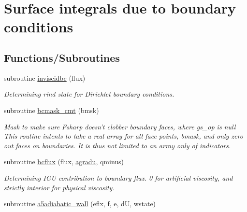 \hypertarget{group__bcond}{\section{Surface integrals due to boundary conditions}
\label{group__bcond}
}
\subsection*{Functions/\-Subroutines}
\begin{DoxyCompactItemize}
\item 
\hypertarget{group__bcond_ga45475eec850fc7ef33c51a25b4f86602}{subroutine \hyperlink{group__bcond_ga45475eec850fc7ef33c51a25b4f86602}{inviscidbc} (flux)}\label{group__bcond_ga45475eec850fc7ef33c51a25b4f86602}

\begin{DoxyCompactList}\small\item\em Determining rind state for Dirichlet boundary conditions. \end{DoxyCompactList}\item 
\hypertarget{group__bcond_ga917af547cc29afcf40e2b54c6a97c90d}{subroutine \hyperlink{group__bcond_ga917af547cc29afcf40e2b54c6a97c90d}{bcmask\-\_\-cmt} (bmsk)}\label{group__bcond_ga917af547cc29afcf40e2b54c6a97c90d}

\begin{DoxyCompactList}\small\item\em Mask to make sure Fsharp doesn't clobber boundary faces, where gs\-\_\-op is null This routine intents to take a real array for all face points, bmask, and only zero out faces on boundaries. It is thus not limited to an array only of indicators. \end{DoxyCompactList}\item 
\hypertarget{group__bcond_ga73b8f242bb8ea95b0c7baf512eeac825}{subroutine \hyperlink{group__bcond_ga73b8f242bb8ea95b0c7baf512eeac825}{bcflux} (flux, \hyperlink{group__vfjac_ga9087d56c6c467d3ffeb9aa6be3f43e82}{agradu}, qminus)}\label{group__bcond_ga73b8f242bb8ea95b0c7baf512eeac825}

\begin{DoxyCompactList}\small\item\em Determining I\-G\-U contribution to boundary flux. 0 for artificial viscosity, and strictly interior for physical viscosity. \end{DoxyCompactList}\item 
\hypertarget{group__bcond_ga9a5825c588243a1c261d107376f5a873}{subroutine \hyperlink{group__bcond_ga9a5825c588243a1c261d107376f5a873}{a5adiabatic\-\_\-wall} (eflx, f, e, d\-U, wstate)}\label{group__bcond_ga9a5825c588243a1c261d107376f5a873}


\end{DoxyCompactItemize}
